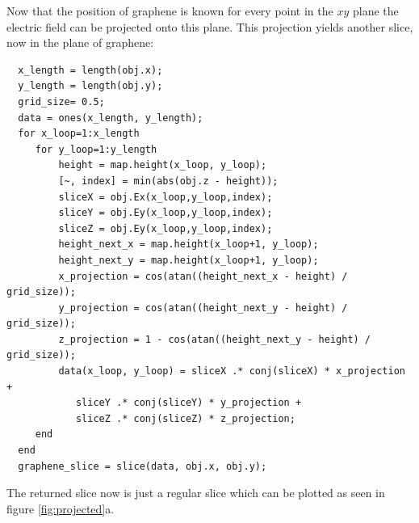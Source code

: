 Now that the position of graphene is known for every point in the $xy$ plane the electric field can be projected onto this plane. This projection yields another slice, now in the plane of graphene:

\begin{verbatim}
  x_length = length(obj.x);
  y_length = length(obj.y);
  grid_size= 0.5;
  data = ones(x_length, y_length);
  for x_loop=1:x_length
     for y_loop=1:y_length
         height = map.height(x_loop, y_loop);
         [~, index] = min(abs(obj.z - height));
         sliceX = obj.Ex(x_loop,y_loop,index);
         sliceY = obj.Ey(x_loop,y_loop,index);
         sliceZ = obj.Ey(x_loop,y_loop,index);
         height_next_x = map.height(x_loop+1, y_loop);
         height_next_y = map.height(x_loop+1, y_loop);
         x_projection = cos(atan((height_next_x - height) / grid_size));
         y_projection = cos(atan((height_next_y - height) / grid_size));
         z_projection = 1 - cos(atan((height_next_y - height) / grid_size));
         data(x_loop, y_loop) = sliceX .* conj(sliceX) * x_projection +
            sliceY .* conj(sliceY) * y_projection +
            sliceZ .* conj(sliceZ) * z_projection;
     end
  end
  graphene_slice = slice(data, obj.x, obj.y);
\end{verbatim}

The returned slice now is just a regular slice which can be plotted as seen in figure \ref{fig:projected}a.


